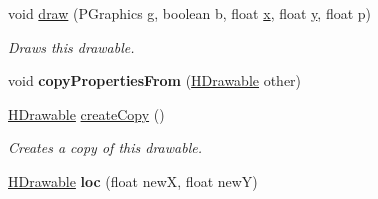 \begin{DoxyCompactItemize}
\item 
void \hyperlink{classhype_1_1core_1_1drawable_1_1_h_stage_a94a4f90ed568346075c188979ed7b257}{draw} (P\-Graphics g, boolean b, float \hyperlink{classhype_1_1core_1_1drawable_1_1_h_stage_a40c96e01d80934ec54a3d816155af657}{x}, float \hyperlink{classhype_1_1core_1_1drawable_1_1_h_stage_a7d42de97ce129b1a563a04f993f3b4de}{y}, float p)
\begin{DoxyCompactList}\small\item\em Draws this drawable. \end{DoxyCompactList}\item 
\hypertarget{classhype_1_1core_1_1drawable_1_1_h_stage_a9e01df5af2c8466f370a3681c384f757}{void {\bfseries copy\-Properties\-From} (\hyperlink{classhype_1_1core_1_1drawable_1_1_h_drawable}{H\-Drawable} other)}\label{classhype_1_1core_1_1drawable_1_1_h_stage_a9e01df5af2c8466f370a3681c384f757}

\item 
\hyperlink{classhype_1_1core_1_1drawable_1_1_h_drawable}{H\-Drawable} \hyperlink{classhype_1_1core_1_1drawable_1_1_h_stage_a1133314946b11f9ff2008a4fa4dfd49e}{create\-Copy} ()
\begin{DoxyCompactList}\small\item\em Creates a copy of this drawable. \end{DoxyCompactList}\item 
\hypertarget{classhype_1_1core_1_1drawable_1_1_h_stage_a935031858d09241c5d5102402fea2ed3}{\hyperlink{classhype_1_1core_1_1drawable_1_1_h_drawable}{H\-Drawable} {\bfseries loc} (float new\-X, float new\-Y)}\label{classhype_1_1core_1_1drawable_1_1_h_stage_a935031858d09241c5d5102402fea2ed3}


\end{DoxyCompactItemize}
